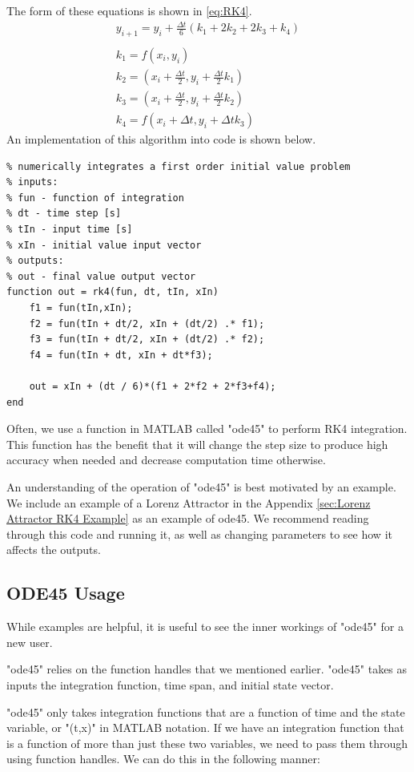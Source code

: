 \documentclass[12pt]{report}
\begin{document}
The form of these equations is shown in \eqref{eq:RK4}.
\begin{gather}\label{eq:RK4}
    y_{i+1}=y_i+\frac{\Delta t}{6}\left(k_1+2k_2+2k_3+k_4\right)\\\\
    k_1=f(x_i,y_i)\\
    k_2=\left(x_i+\frac{\Delta t}{2},y_i+\frac{\Delta t}{2}k_1\right)\\
    k_3=\left(x_i+\frac{\Delta t}{2},y_i+\frac{\Delta t}{2}k_2\right)\\
    k_4=f(x_i+\Delta t,y_i+\Delta tk_3)
\end{gather}
An implementation of this algorithm into code is shown below.
\begin{lstlisting}[style=Matlab-editor, caption=RK4 Integrator]
%% RK4 Integrator
% numerically integrates a first order initial value problem
% inputs:
% fun - function of integration
% dt - time step [s]
% tIn - input time [s]
% xIn - initial value input vector
% outputs:
% out - final value output vector
function out = rk4(fun, dt, tIn, xIn)
    f1 = fun(tIn,xIn);
    f2 = fun(tIn + dt/2, xIn + (dt/2) .* f1);
    f3 = fun(tIn + dt/2, xIn + (dt/2) .* f2);
    f4 = fun(tIn + dt, xIn + dt*f3);
    
    out = xIn + (dt / 6)*(f1 + 2*f2 + 2*f3+f4);
end
\end{lstlisting}\label{code:rk4}
Often, we use a function in MATLAB called "ode45" to perform RK4 integration. This function has the benefit that it will change the step size to produce high accuracy when needed and decrease computation time otherwise.

An understanding of the operation of "ode45" is best motivated by an example. We include an example of a Lorenz Attractor in the Appendix \ref{sec:Lorenz Attractor RK4 Example} as an example of ode45. We recommend reading through this code and running it, as well as changing parameters to see how it affects the outputs.
\subsection{ODE45 Usage}
While examples are helpful, it is useful to see the inner workings of "ode45" for a new user. 

"ode45" relies on the function handles that we mentioned earlier. "ode45" takes as inputs the integration function, time span, and initial state vector.

"ode45" only takes integration functions that are a function of time and the state variable, or "(t,x)" in MATLAB notation. If we have an integration function that is a function of more than just these two variables, we need to pass them through using function handles. We can do this in the following manner:
\end{document}
